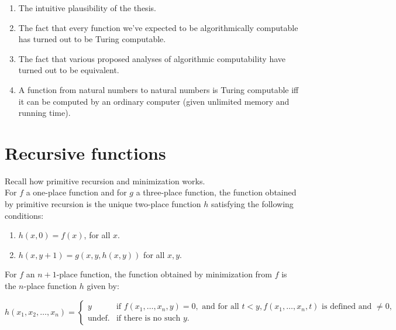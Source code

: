 \documentclass[justified]{tufte-handout}
\begin{document}
\begin{enumerate}
\item The intuitive plausibility of the thesis.
\item The fact that every function we've expected to be algorithmically computable has turned out to be Turing computable.
\item The fact  that various proposed analyses of algorithmic computability have turned out to be equivalent.
\item A function from natural numbers to natural numbers is Turing computable iff it can be computed by an ordinary computer (given unlimited memory and running time).
\end{enumerate}

\section{Recursive functions}

\noindent Recall how primitive recursion and minimization works.\\

\noindent For $f$ a one-place function and for $g$ a three-place function, the function obtained by primitive recursion is the unique two-place function $h$ satisfying the following conditions:

\begin{enumerate}[label=(\roman*)]
\item $h(x,0)=f(x)$, for all $x$.
\item $h(x,y+1)=g(x,y,h(x,y))$ for all $x,y$.\\
\end{enumerate}

\noindent For $f$ an $n+1$-place function, the function obtained by minimization from $f$ is the $n$-place function $h$ given by:

\[
    h(x_1,x_2,\dots,x_n)= 
\begin{cases}
   y & \text{if }f(x_1,\dots,x_n,y)=0,\text{ and for all }t<y, f(x_1,\dots,x_n,t)\text{ is defined and }\neq0,\\
    \text{undef.}              &  \text{if there is no such $y$}.
\end{cases}
\]
\end{document}
